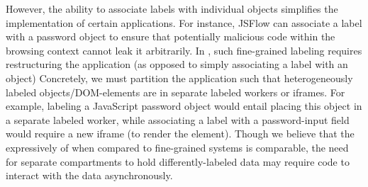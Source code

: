 
However, the ability to associate labels with individual objects
simplifies the implementation of certain applications. 
%
For instance, JSFlow can associate a label with a password object
to ensure that potentially malicious code within the browsing context
cannot leak it arbitrarily.
%
In \sys{}, such fine-grained labeling requires restructuring the
application (as opposed to simply associating a label with an object)
%
Concretely, we must partition the application such that
heterogeneously labeled objects/DOM-elements are in separate labeled
workers or iframes.
%
For example, labeling a JavaScript password object would entail
placing this object in a separate labeled worker, while associating a
label with a password-input field would require a new iframe (to
render the element).
%
Though we believe that the expressively of \sys{} when compared to
fine-grained systems is comparable, the need for separate compartments
to hold differently-labeled data may require code to interact with the
data asynchronously.


